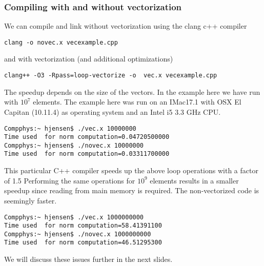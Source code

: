 \documentclass{beamer}
\begin{document}
\begin{frame}
\frametitle{Compiling with and without vectorization}

We can compile and link without vectorization using the clang c++ compiler


\begin{verbatim}
clang -o novec.x vecexample.cpp

\end{verbatim}

and with vectorization (and additional optimizations)


\begin{verbatim}
clang++ -O3 -Rpass=loop-vectorize -o  vec.x vecexample.cpp 

\end{verbatim}

The speedup depends on the size of the vectors. In the example here we have run with $10^7$ elements.
The example here was run on an IMac17.1 with OSX El Capitan (10.11.4) as operating system and an Intel i5 3.3 GHz CPU.  





\begin{verbatim}
Compphys:~ hjensen$ ./vec.x 10000000
Time used  for norm computation=0.04720500000
Compphys:~ hjensen$ ./novec.x 10000000
Time used  for norm computation=0.03311700000

\end{verbatim}

This particular C++ compiler speeds up the above loop operations with a factor of 1.5 
Performing the same operations for $10^9$ elements results in a smaller speedup since reading from main memory is required. The non-vectorized code is seemingly faster. 





\begin{verbatim}
Compphys:~ hjensen$ ./vec.x 1000000000
Time used  for norm computation=58.41391100
Compphys:~ hjensen$ ./novec.x 1000000000
Time used  for norm computation=46.51295300

\end{verbatim}

We will discuss these issues further in the next slides.
\end{frame}
\end{document}

